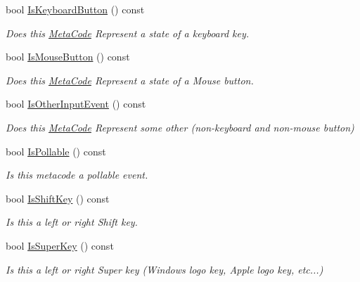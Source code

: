 \begin{DoxyCompactItemize}
bool \hyperlink{classMezzanine_1_1MetaCode_aedca54cabda99b18c4186ceb3bfa0944}{IsKeyboardButton} () const 
\begin{DoxyCompactList}\small\item\em Does this \hyperlink{classMezzanine_1_1MetaCode}{MetaCode} Represent a state of a keyboard key. \item\end{DoxyCompactList}\item 
bool \hyperlink{classMezzanine_1_1MetaCode_a4277faacd0e1633df7f30cbf7b8f5dd1}{IsMouseButton} () const 
\begin{DoxyCompactList}\small\item\em Does this \hyperlink{classMezzanine_1_1MetaCode}{MetaCode} Represent a state of a Mouse button. \item\end{DoxyCompactList}\item 
bool \hyperlink{classMezzanine_1_1MetaCode_a88c99813475a4968c498da57ee1304b2}{IsOtherInputEvent} () const 
\begin{DoxyCompactList}\small\item\em Does this \hyperlink{classMezzanine_1_1MetaCode}{MetaCode} Represent some other (non-\/keyboard and non-\/mouse button) \item\end{DoxyCompactList}\item 
bool \hyperlink{classMezzanine_1_1MetaCode_a30c79f6b4fa991a6fa42226f4c255fe9}{IsPollable} () const 
\begin{DoxyCompactList}\small\item\em Is this metacode a pollable event. \item\end{DoxyCompactList}\item 
bool \hyperlink{classMezzanine_1_1MetaCode_a3af3c353b814482fa2c6c68238ced612}{IsShiftKey} () const 
\begin{DoxyCompactList}\small\item\em Is this a left or right Shift key. \item\end{DoxyCompactList}\item 
bool \hyperlink{classMezzanine_1_1MetaCode_a85c370eb28387758e4498d2da656915a}{IsSuperKey} () const 
\begin{DoxyCompactList}\small\item\em Is this a left or right Super key (Windows logo key, Apple logo key, etc...) \item\end{DoxyCompactList}\item 

\end{DoxyCompactItemize}
